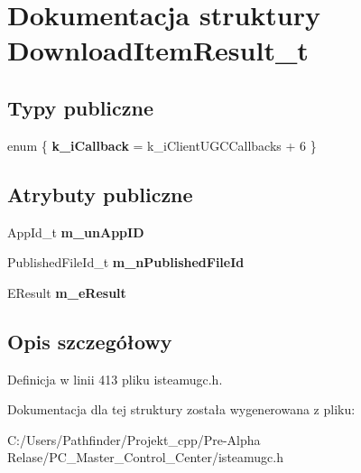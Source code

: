 \hypertarget{struct_download_item_result__t}{}\section{Dokumentacja struktury Download\+Item\+Result\+\_\+t}
\label{struct_download_item_result__t}
\subsection*{Typy publiczne}
\begin{DoxyCompactItemize}
\item 
\mbox{\label{struct_download_item_result__t_a68dd4c8b6c3f57ec8d5cfe9c851a77ab}} 
enum \{ {\bfseries k\+\_\+i\+Callback} = k\+\_\+i\+Client\+U\+G\+C\+Callbacks + 6
 \}
\end{DoxyCompactItemize}
\subsection*{Atrybuty publiczne}
\begin{DoxyCompactItemize}
\item 
\mbox{\label{struct_download_item_result__t_a2579da902b0caad9c264576d72b791c6}} 
App\+Id\+\_\+t {\bfseries m\+\_\+un\+App\+ID}
\item 
\mbox{\label{struct_download_item_result__t_a96e8c1bfe8718a06a629ab429b766528}} 
Published\+File\+Id\+\_\+t {\bfseries m\+\_\+n\+Published\+File\+Id}
\item 
\mbox{\label{struct_download_item_result__t_a03f32eabc4530ce700323483b11db6b7}} 
E\+Result {\bfseries m\+\_\+e\+Result}
\end{DoxyCompactItemize}


\subsection{Opis szczegółowy}


Definicja w linii 413 pliku isteamugc.\+h.



Dokumentacja dla tej struktury została wygenerowana z pliku\+:\begin{DoxyCompactItemize}
\item 
C\+:/\+Users/\+Pathfinder/\+Projekt\+\_\+cpp/\+Pre-\/\+Alpha Relase/\+P\+C\+\_\+\+Master\+\_\+\+Control\+\_\+\+Center/isteamugc.\+h\end{DoxyCompactItemize}
